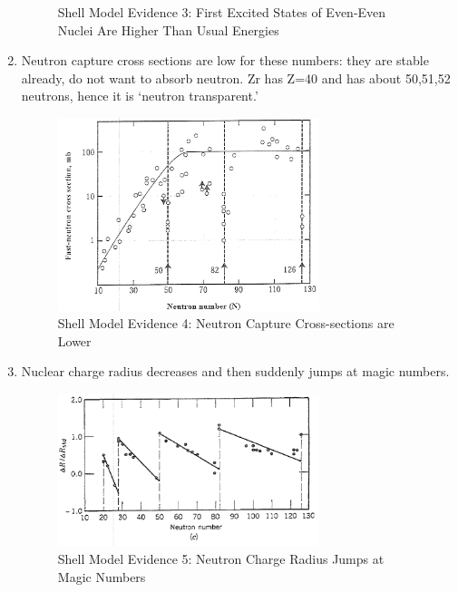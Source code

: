\documentclass{school-22.101-notes}
\begin{document}
\begin{enumerate}
\begin{figure}
    \caption{Shell Model Evidence 3: First Excited States of Even-Even Nuclei Are Higher Than Usual Energies}
\end{figure}
\item Neutron capture cross sections are low for these numbers: they are stable already, do not want to absorb neutron. Zr has Z=40 and has about 50,51,52 neutrons, hence it is `neutron transparent.'
\begin{figure}
    \centering
    \includegraphics[width=3in]{images/shell/shell-evidence-4.png}
    \caption{Shell Model Evidence 4: Neutron Capture Cross-sections are Lower}
\end{figure}
\item Nuclear charge radius decreases and then suddenly jumps at magic numbers. 
\begin{figure}
    \centering
    \includegraphics[width=3in]{images/shell/shell-evidence-5.png}
    \caption{Shell Model Evidence 5: Neutron Charge Radius Jumps at Magic Numbers}
\end{figure}
\end{enumerate}
\end{document}

